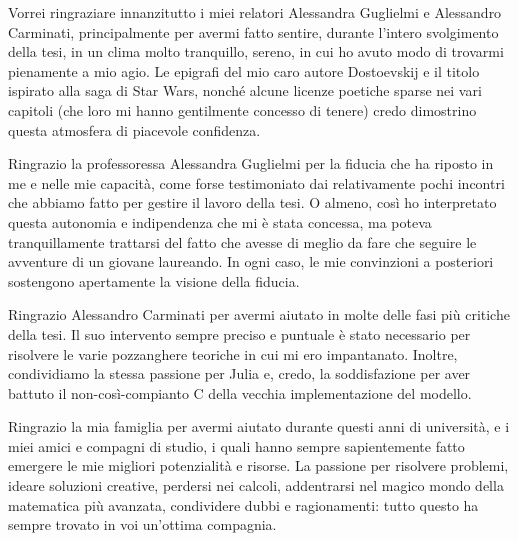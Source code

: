 \documentclass[12pt,	%
	a4paper,		%
	twoside,		%
	openright,		%
	titlepage,%
	]{book}
\theoremstyle{definition}
\begin{document}
Vorrei ringraziare innanzitutto i miei relatori Alessandra Guglielmi e Alessandro Carminati, principalmente per avermi fatto sentire, durante l'intero svolgimento della tesi, in un clima molto tranquillo, sereno, in cui ho avuto modo di trovarmi pienamente a mio agio. Le epigrafi del mio caro autore Dostoevskij e il titolo ispirato alla saga di Star Wars, nonché alcune licenze poetiche sparse nei vari capitoli (che loro mi hanno gentilmente concesso di tenere) credo dimostrino questa atmosfera di piacevole confidenza.

Ringrazio la professoressa Alessandra Guglielmi per la fiducia che ha riposto in me e nelle mie capacità, come forse testimoniato dai relativamente pochi incontri che abbiamo fatto per gestire il lavoro della tesi. O almeno, così ho interpretato questa autonomia e indipendenza che mi è stata concessa, ma poteva tranquillamente trattarsi del fatto che avesse di meglio da fare che seguire le avventure di un giovane laureando. In ogni caso, le mie convinzioni a posteriori sostengono apertamente la visione della fiducia.

Ringrazio Alessandro Carminati per avermi aiutato in molte delle fasi più critiche della tesi. Il suo intervento sempre preciso e puntuale è stato necessario per risolvere le varie pozzanghere teoriche in cui mi ero impantanato. Inoltre, condividiamo la stessa passione per Julia e, credo, la soddisfazione per aver battuto il non-così-compianto C della vecchia implementazione del modello.

Ringrazio la mia famiglia per avermi aiutato durante questi anni di università, e i miei amici e compagni di studio, i quali hanno sempre sapientemente fatto emergere le mie migliori potenzialità e risorse. La passione per risolvere problemi, ideare soluzioni creative, perdersi nei calcoli, addentrarsi nel magico mondo della matematica più avanzata, condividere dubbi e ragionamenti: tutto questo ha sempre trovato in voi un'ottima compagnia.




\end{document}
